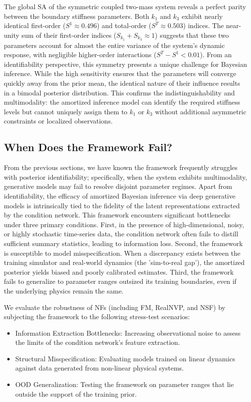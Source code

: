 The global \ac{SA} of the symmetric coupled two-mass system reveals a perfect parity between the boundary stiffness parameters. Both $k_1$ and $k_3$ exhibit nearly identical first-order ($S^1\approx 0.496$) and total-order ($S^T\approx 0.503$) indices. The near-unity sum of their first-order indices ($S_{k_1}+S_{k_3}\approx 1$) suggests that these two parameters account for almost the entire variance of the system's dynamic response, with negligible higher-order interactions ($S^T-S^1<0.01$). From an identifiability perspective, this symmetry presents a unique challenge for Bayesian inference. While the high sensitivity ensures that the parameters will converge quickly away from the prior mean, the identical nature of their influence results in a bimodal posterior distribution. This confirms the indistinguishability and multimodality: the amortized inference model can identify the required stiffness levels but cannot uniquely assign them to $k_1$ or $k_3$ without additional asymmetric constraints or localized observations.

\subsection{When Does the Framework Fail?}
From the previous sections, we have known the framework frequently struggles with posterior identifiability; specifically, when the system exhibits multimodality, generative models may fail to resolve disjoint parameter regimes. Apart from identifiability, the efficacy of amortized Bayesian inference via deep generative models is intrinsically tied to the fidelity of the latent representations extracted by the condition network. This framework encounters significant bottlenecks under three primary conditions. First, in the presence of high-dimensional, noisy, or highly stochastic time-series data, the condition network often fails to distill sufficient summary statistics, leading to information loss. Second, the framework is susceptible to model misspecification. When a discrepancy exists between the training simulator and real-world dynamics (the 'sim-to-real gap'), the amortized posterior yields biased and poorly calibrated estimates. Third, the framework fails to generalize to parameter ranges outsized its training boundaries, even if the underlying physics remain the same. 

We evaluate the robustness of \acp{NF} (including \ac{FM}, \ac{RealNVP}, and \ac{NSF}) by subjecting the framework to the following stress-test scenarios:
\begin{itemize}
\item Information Extraction Bottlenecks: Increasing observational noise to assess the limits of the condition network's feature extraction.
\item Structural Misspecification: Evaluating models trained on linear dynamics against data generated from non-linear physical systems.
\item \ac{OOD} Generalization: Testing the framework on parameter ranges that lie outside the support of the training prior.
\end{itemize}

